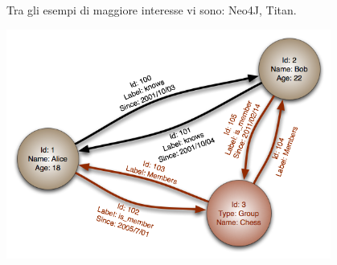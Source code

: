 \begin{itemize}
    Tra gli esempi di maggiore interesse vi sono: Neo4J, Titan.

    \includegraphics[width=0.8\textwidth]{img/dbGrafo}
\end{itemize}
